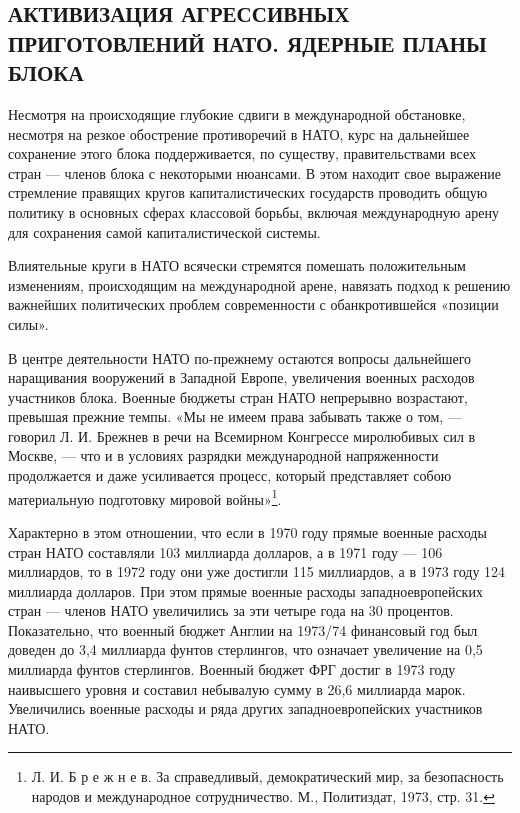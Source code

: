 \documentclass[12pt, a4paper, openany]{book}
\begin{document}
		\subsection[Активизация агрессивных приготовлений НАТО. Ядерные планы блока]{\center АКТИВИЗАЦИЯ АГРЕССИВНЫХ ПРИГОТОВЛЕНИЙ НАТО. ЯДЕРНЫЕ ПЛАНЫ БЛОКА}	
	
	
	Несмотря на происходящие глубокие сдвиги в международной обстановке, несмотря на резкое обострение противоречий в НАТО, курс на дальнейшее сохранение этого блока поддерживается, по существу, правительствами всех стран — членов блока с некоторыми нюансами. В этом находит свое выражение стремление правящих кругов капиталистических государств проводить общую политику в основных сферах классовой борьбы, включая международную арену для сохранения самой капиталистической системы.
	
	Влиятельные круги в НАТО всячески стремятся помешать положительным изменениям, происходящим на международной арене, навязать подход к решению важнейших политических проблем современности с обанкротившейся «позиции силы».
	
	В центре деятельности НАТО по-прежнему остаются вопросы дальнейшего наращивания вооружений в Западной Европе, увеличения военных расходов участников блока. Военные бюджеты стран НАТО непрерывно возрастают, превышая прежние темпы. «Мы не имеем права забывать также о том, — говорил Л. И. Брежнев в речи на Всемирном Конгрессе миролюбивых сил в Москве, — что и в условиях разрядки международной напряженности продолжается и даже усиливается процесс, который представляет собою материальную подготовку мировой войны»{\footnote{Л. И. Б р е ж н е в. За справедливый, демократический мир, за безопасность народов и международное сотрудничество. М., Политиздат, 1973, стр. 31.}}.
	
	Характерно в этом отношении, что если в 1970 году прямые военные расходы стран НАТО составляли 103 миллиарда долларов, а в 1971 году — 106 миллиардов, то в 1972 году они уже достигли 115 миллиардов, а в 1973 году 124 миллиарда долларов. При этом прямые военные расходы западноевропейских стран — членов НАТО увеличились за эти четыре года на 30 процентов. Показательно, что военный бюджет Англии на 1973/74 финансовый год был доведен до 3,4 миллиарда фунтов стерлингов, что означает увеличение на 0,5 миллиарда фунтов стерлингов. Военный бюджет ФРГ достиг в 1973 году наивысшего уровня и составил небывалую сумму в 26,6 миллиарда марок. Увеличились военные расходы и ряда других западноевропейских участников НАТО.
	
\end{document}
